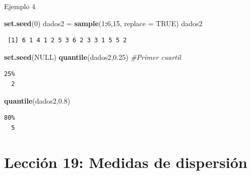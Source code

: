 \documentclass[
  ignorenonframetext,
  aspectratio=169]{beamer}
\newenvironment{Shaded}{\begin{snugshade}}{\end{snugshade}}
\newcommand{\AttributeTok}[1]{\textcolor[rgb]{0.13,0.29,0.53}{#1}}
\newcommand{\CommentTok}[1]{\textcolor[rgb]{0.56,0.35,0.01}{\textit{#1}}}
\newcommand{\ConstantTok}[1]{\textcolor[rgb]{0.56,0.35,0.01}{#1}}
\newcommand{\DecValTok}[1]{\textcolor[rgb]{0.00,0.00,0.81}{#1}}
\newcommand{\FloatTok}[1]{\textcolor[rgb]{0.00,0.00,0.81}{#1}}
\newcommand{\FunctionTok}[1]{\textcolor[rgb]{0.13,0.29,0.53}{\textbf{#1}}}
\newcommand{\NormalTok}[1]{#1}
\newcommand{\OtherTok}[1]{\textcolor[rgb]{0.56,0.35,0.01}{#1}}
\newcommand{\SpecialCharTok}[1]{\textcolor[rgb]{0.81,0.36,0.00}{\textbf{#1}}}
\begin{document}
\begin{frame}[fragile]{Ejemplo 4}
\label{ejemplo-4-8}
\begin{Shaded}
\begin{Highlighting}[]
\FunctionTok{set.seed}\NormalTok{(}\DecValTok{0}\NormalTok{)}
\NormalTok{dados2 }\OtherTok{=} \FunctionTok{sample}\NormalTok{(}\DecValTok{1}\SpecialCharTok{:}\DecValTok{6}\NormalTok{,}\DecValTok{15}\NormalTok{, }\AttributeTok{replace =} \ConstantTok{TRUE}\NormalTok{)}
\NormalTok{dados2}
\end{Highlighting}
\end{Shaded}

\begin{verbatim}
 [1] 6 1 4 1 2 5 3 6 2 3 3 1 5 5 2
\end{verbatim}

\begin{Shaded}
\begin{Highlighting}[]
\FunctionTok{set.seed}\NormalTok{(}\ConstantTok{NULL}\NormalTok{)}
\FunctionTok{quantile}\NormalTok{(dados2,}\FloatTok{0.25}\NormalTok{) }\CommentTok{\#Primer cuartil}
\end{Highlighting}
\end{Shaded}

\begin{verbatim}
25% 
  2 
\end{verbatim}

\begin{Shaded}
\begin{Highlighting}[]
\FunctionTok{quantile}\NormalTok{(dados2,}\FloatTok{0.8}\NormalTok{)}
\end{Highlighting}
\end{Shaded}

\begin{verbatim}
80% 
  5 
\end{verbatim}
\end{frame}

\section{Lección 19: Medidas de
dispersión}\label{lecciuxf3n-19-medidas-de-dispersiuxf3n}
\end{document}
